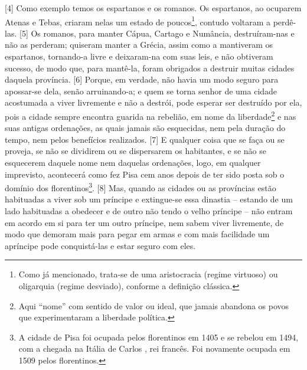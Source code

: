 {[}4{]} Como exemplo temos os espartanos e os romanos. Os espartanos, ao
ocuparem Atenas e Tebas, criaram nelas um estado de poucos\footnote{Como
  já mencionado, trata-se de uma aristocracia (regime virtuoso) ou
  oligarquia (regime desviado), conforme a definição clássica.}, contudo
voltaram a perdê-las. {[}5{]} Os romanos, para manter Cápua, Cartago e
Numância, destruíram-nas e não as perderam; quiseram manter a Grécia,
assim como a mantiveram os espartanos, tornando-a livre e deixaram-na
com suas leis, e não obtiveram sucesso, de modo que, para mantê-la,
foram obrigados a destruir muitas cidades daquela província. {[}6{]}
Porque, em verdade, não havia um modo seguro para apossar-se dela, senão
arruinando-a; e quem se torna senhor de uma cidade acostumada a viver
livremente e não a destrói, pode esperar ser destruído por ela, pois a
cidade sempre encontra guarida na rebelião, em nome da
liberdade\footnote{Aqui ``nome'' com sentido de valor ou ideal, que
  jamais abandona os povos que experimentaram a liberdade política.} e
nas suas antigas ordenações, as quais jamais são esquecidas, nem pela
duração do tempo, nem pelos benefícios realizados. {[}7{]} E qualquer
coisa que se faça ou se proveja, se não se dividirem ou se dispersarem
os habitantes, e se não se esquecerem daquele nome nem daquelas
ordenações, logo, em qualquer imprevisto, acontecerá como fez Pisa cem
anos depois de ter sido posta sob o domínio dos florentinos\footnote{A
  cidade de Pisa foi ocupada pelos florentinos em 1405 e se rebelou em
  1494, com a chegada na Itália de Carlos , rei francês. Foi
  novamente ocupada em 1509 pelos florentinos.}. {[}8{]} Mas, quando as
cidades ou as províncias estão habituadas a viver sob um príncipe e
extingue-se essa dinastia -- estando de um lado habituadas a obedecer e
de outro não tendo o velho príncipe -- não entram em acordo em si para
ter um outro príncipe, nem sabem viver livremente, de modo que demoram
mais para pegar em armas e com mais facilidade um apríncipe pode
conquistá-las e estar seguro com eles.

